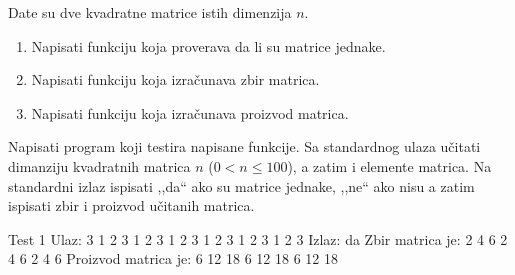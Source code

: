 \begin{Exercise}[label=315]
Date su dve kvadratne matrice istih dimenzija $n$. 
\begin{enumerate}
\item Napisati funkciju koja proverava da li su matrice jednake.
\item Napisati funkciju koja izračunava zbir matrica.
\item Napisati funkciju koja izračunava proizvod matrica.
\end{enumerate}
Napisati program koji testira napisane funkcije. Sa standardnog
ulaza učitati dimanziju kvadratnih matrica $n$
($0 < n \leq 100$), a zatim i elemente matrica. Na standardni izlaz
ispisati ,,da`` ako su matrice jednake, ,,ne`` ako nisu a zatim ispisati
zbir i proizvod učitanih matrica.

\begin{maxitest}
\begin{test}{Test 1}
Ulaz:   3 
        1 2 3 1 2 3 1 2 3
        1 2 3 1 2 3 1 2 3
Izlaz:  da
        Zbir matrica je:
        2 4 6
        2 4 6
        2 4 6
        Proizvod matrica je:
        6 12 18
        6 12 18
        6 12 18
\end{test}
\end{maxitest}
\end{Exercise}
\begin{Answer}[ref=315]
\end{Answer}

